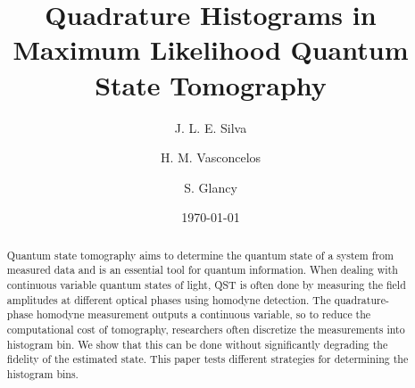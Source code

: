 \documentclass[
reprint,
superscriptaddress,
showpacs,
amsmath,
amssymb,
aps,
pra,
longbibliography
]{revtex4-1}
\begin{document}

\title{Quadrature Histograms in Maximum Likelihood Quantum State Tomography}%
\author{J. L. E. Silva}
\author{H. M. Vasconcelos}
\author{S. Glancy}


\date{\today}%

\begin{abstract}
  Quantum state tomography aims to determine the quantum
  state of a system from measured data and is an essential tool for
  quantum information. When dealing with continuous variable
  quantum states of light, QST is often done by measuring
  the field amplitudes at different
  optical phases using homodyne detection. The quadrature-phase
  homodyne measurement outputs a continuous variable, so to reduce
    the computational cost of tomography, researchers often discretize
    the measurements into histogram bin.  We show that this can be
    done without significantly degrading the fidelity of the estimated
    state.  This paper tests different strategies for determining the
    histogram bins.
\end{abstract}

\maketitle

\end{document}
